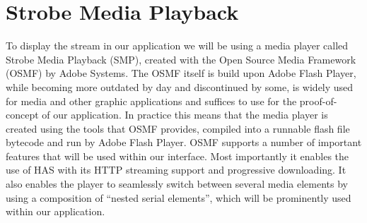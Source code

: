 \section{Strobe Media Playback}
\label{sec:smp}

To display the stream in our application we will be using a media player called Strobe Media Playback (SMP), created with the Open Source Media Framework (OSMF) by Adobe Systems. The OSMF itself is build upon Adobe Flash Player, while becoming more outdated by day and discontinued by some, is widely used for media and other graphic applications and suffices to use for the proof-of-concept of our application. In practice this means that the media player is created using the tools that OSMF provides, compiled into a runnable flash file bytecode and run by Adobe Flash Player. 
OSMF supports a number of important features that will be used within our interface. Most importantly it enables the use of HAS with its HTTP streaming support and progressive downloading. It also enables the player to seamlessly switch between several media elements by using a composition of “nested serial elements”, which will be prominently used within our application.\cite{osmf}

